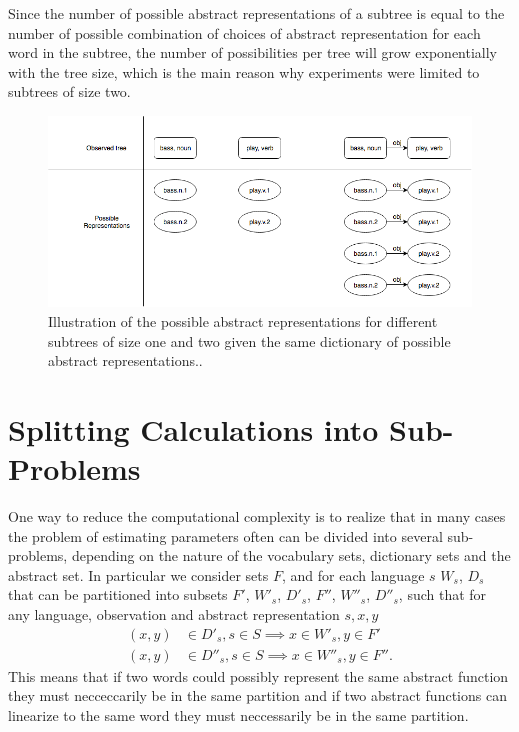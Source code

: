 Since the number of possible abstract representations of a subtree is equal to the number of possible combination of choices of abstract representation for each word in the subtree, the number of possibilities per tree will grow exponentially with the tree size, which is the main reason why experiments were limited to subtrees of size two.
\begin{figure}[!htbp]
\includegraphics[width=\linewidth]{figure/poss_subtrees.png}
\caption{Illustration of the possible abstract representations for different subtrees of size one and two given the same dictionary of possible abstract representations..}
\label{fig:ast}
\end{figure}

\section{Splitting Calculations into Sub-Problems}
One way to reduce the computational complexity is to realize that in many cases the problem of estimating parameters often can be divided into several sub-problems, depending on the nature of the vocabulary sets, dictionary sets and the abstract set. In particular we consider sets $F$, and for each language $s$ $W_s$, $D_s$ that can be partitioned into subsets $F'$, $W'_s$, $D'_s$, $F''$, $W''_s$, $D''_s$, such that for any language, observation and abstract representation $s, x, y$
\begin{align*}
    (x,y)&\in D'_s, s\in S \implies x\in W'_s, y\in F'\\
    (x,y)&\in D''_s, s\in S \implies x\in W''_s, y\in F''.
\end{align*}
This means that if two words could possibly represent the same abstract function they must necceccarily be in the same partition and if two abstract functions can linearize to the same word they must neccessarily be in the same partition.

